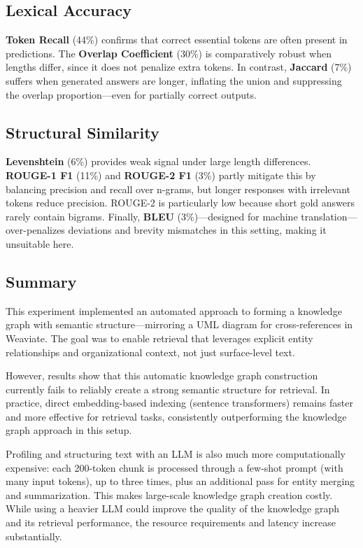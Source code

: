 \subsection{Lexical Accuracy}
	\textbf{Token Recall} (44\%) confirms that correct essential tokens are often present in predictions. The \textbf{Overlap Coefficient} (30\%) is comparatively robust when lengths differ, since it does not penalize extra tokens. In contrast, \textbf{Jaccard} (7\%) suffers when generated answers are longer, inflating the union and suppressing the overlap proportion—even for partially correct outputs.

\subsection{Structural Similarity}
	\textbf{Levenshtein} (6\%) provides weak signal under large length differences. \textbf{ROUGE-1 F1} (11\%) and \textbf{ROUGE-2 F1} (3\%) partly mitigate this by balancing precision and recall over n-grams, but longer responses with irrelevant tokens reduce precision. ROUGE-2 is particularly low because short gold answers rarely contain bigrams. Finally, \textbf{BLEU} (3\%)—designed for machine translation—over-penalizes deviations and brevity mismatches in this setting, making it unsuitable here.

\subsection{Summary}
This experiment implemented an automated approach to forming a knowledge graph with semantic structure—mirroring a UML diagram for cross-references in Weaviate. The goal was to enable retrieval that leverages explicit entity relationships and organizational context, not just surface-level text.

However, results show that this automatic knowledge graph construction currently fails to reliably create a strong semantic structure for retrieval. In practice, direct embedding-based indexing (sentence transformers) remains faster and more effective for retrieval tasks, consistently outperforming the knowledge graph approach in this setup.

Profiling and structuring text with an LLM is also much more computationally expensive: each 200-token chunk is processed through a few-shot prompt (with many input tokens), up to three times, plus an additional pass for entity merging and summarization. This makes large-scale knowledge graph creation costly. While using a heavier LLM could improve the quality of the knowledge graph and its retrieval performance, the resource requirements and latency increase substantially.


